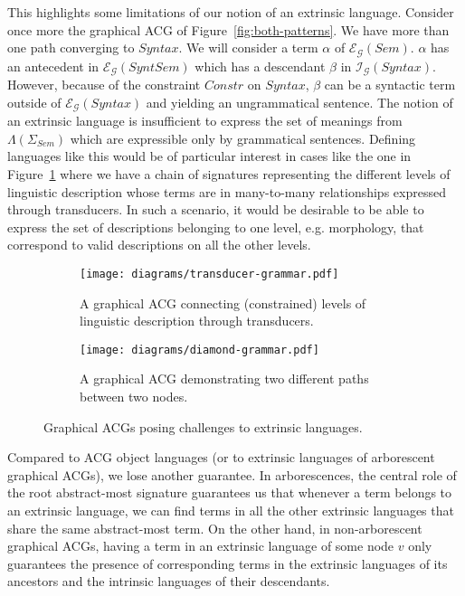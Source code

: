 This highlights some limitations of our notion of an extrinsic
language. Consider once more the graphical ACG of
Figure~\ref{fig:both-patterns}. We have more than one path converging to
$Syntax$. We will consider a term $\alpha$ of
$\mathcal{E}_{\mathcal{G}}(Sem)$. $\alpha$ has an antecedent in
$\mathcal{E}_{\mathcal{G}}(SyntSem)$ which has a descendant $\beta$ in
$\mathcal{I}_{\mathcal{G}}(Syntax)$. However, because of the constraint
$Constr$ on $Syntax$, $\beta$ can be a syntactic term outside of
$\mathcal{E}_{\mathcal{G}}(Syntax)$ and yielding an ungrammatical
sentence. The notion of an extrinsic language is insufficient to express
the set of meanings from $\Lambda(\Sigma_{Sem})$ which are expressible
only by grammatical sentences. Defining languages like this would be of
particular interest in cases like the one in
Figure~\ref{fig:transducer-grammar} where we have a chain of signatures
representing the different levels of linguistic description whose terms
are in many-to-many relationships expressed through transducers. In such
a scenario, it would be desirable to be able to express the set of
descriptions belonging to one level, e.g. morphology, that correspond to
valid descriptions on all the other levels.

\begin{figure}[t]
  \centering
  \begin{subfigure}[b]{0.4\textwidth}
    \centering
    \texttt{[image: diagrams/transducer-grammar.pdf]}
    \caption{{\label{fig:transducer-grammar} A graphical ACG connecting
        (constrained) levels of linguistic description through
        transducers.}}
  \end{subfigure}
  \qquad
  \begin{subfigure}[b]{0.4\textwidth}
    \centering
    \texttt{[image: diagrams/diamond-grammar.pdf]}
    \caption{{\label{fig:diamond-grammar} A graphical ACG demonstrating
        two different paths between two nodes.}}
  \end{subfigure}
  \caption{Graphical ACGs posing challenges to extrinsic languages.}
\end{figure}

Compared to ACG object languages (or to extrinsic languages of
arborescent graphical ACGs), we lose another guarantee. In
arborescences, the central role of the root abstract-most signature
guarantees us that whenever a term belongs to an extrinsic language, we
can find terms in all the other extrinsic languages that share the same
abstract-most term. On the other hand, in non-arborescent graphical
ACGs, having a term in an extrinsic language of some node $v$ only
guarantees the presence of corresponding terms in the extrinsic
languages of its ancestors and the intrinsic languages of their
descendants.

